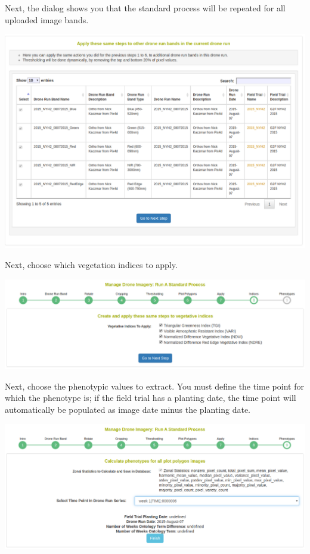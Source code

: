 \documentclass[
  12pt,
]{book}
\begin{document}
Next, the dialog shows you that the standard process will be repeated for all uploaded image bands.

\begin{center}\includegraphics[width=0.95\linewidth]{assets/images/manage_image_phenotyping_standard_process_apply} \end{center}

Next, choose which vegetation indices to apply.

\begin{center}\includegraphics[width=0.95\linewidth]{assets/images/manage_image_phenotyping_standard_process_vegetation_index} \end{center}

Next, choose the phenotypic values to extract. You must define the time point for which the phenotype is; if the field trial has a planting date, the time point will automatically be populated as image date minus the planting date.

\begin{center}\includegraphics[width=0.95\linewidth]{assets/images/manage_image_phenotyping_standard_process_phenotypes} \end{center}
\end{document}

